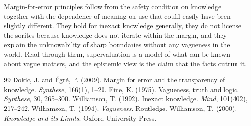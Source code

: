 \documentclass{situationist-preprint}
\begin{document}
Margin-for-error principles follow from the safety condition on knowledge together with the dependence of meaning on use that could easily have been slightly different. They hold for inexact knowledge generally, they do not license the sorites because knowledge does not iterate within the margin, and they explain the unknowability of sharp boundaries without any vagueness in the world. Read through them, supervaluation is a model of what can be known about vague matters, and the epistemic view is the claim that the facts outrun it.

\begin{thebibliography}{99}\small
{} Dokic, J. and \'Egr\'e, P. (2009). Margin for error and the transparency of knowledge. \emph{Synthese}, 166(1), 1--20.
 Fine, K. (1975). Vagueness, truth and logic. \emph{Synthese}, 30, 265--300.
 Williamson, T. (1992). Inexact knowledge. \emph{Mind}, 101(402), 217--242.
 Williamson, T. (1994). \emph{Vagueness}. Routledge.
 Williamson, T. (2000). \emph{Knowledge and its Limits}. Oxford University Press.
\end{thebibliography}
\end{document}
